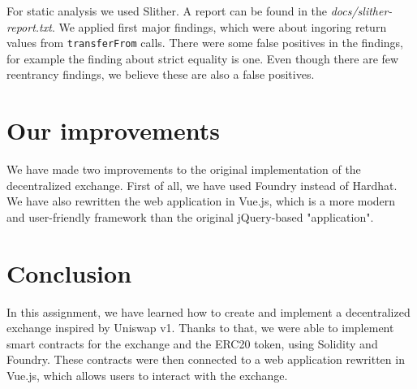 \documentclass[11pt,a4paper]{article}
\begin{document}
For static analysis we used Slither\cite{slitherGithub}. A report can be found
in the \emph{docs/slither-report.txt}. We applied first major findings, which
were about ingoring return values from \texttt{transferFrom} calls. There were
some false positives in the findings, for example the finding about strict
equality is one. Even though there are few reentrancy findings, we believe
these are also a false positives.

\section{Our improvements}

We have made two improvements to the original implementation of the
decentralized exchange. First of all, we have used Foundry instead of Hardhat.
We have also rewritten the web application in Vue.js, which is a more modern and
user-friendly framework than the original jQuery-based "application".

\section{Conclusion}

In this assignment, we have learned how to create and implement a
decentralized exchange inspired by Uniswap v1. Thanks to that, we were able to
implement smart contracts for the exchange and the ERC20 token, using
Solidity and Foundry. These contracts were then connected to a web application
rewritten in Vue.js, which allows users to interact with the exchange.



\end{document}
